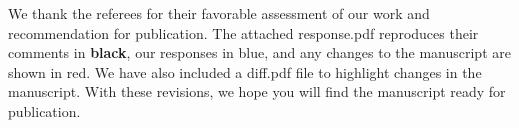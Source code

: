 \documentclass[12pt,stdletter,dateno,sigleft]{newlfm} %
\newcommand{\cor}{\color{red}}
\newcommand{\cob}{\color{blue}}
\begin{document}
\begin{newlfm}


We thank the referees for their favorable assessment of our work and recommendation for publication.  The attached response.pdf reproduces their comments in {\bf black}, our responses in {\cob blue}, and any changes to the manuscript are shown in {\cor red}.  We have also included a diff.pdf file to highlight changes in the manuscript.  With these revisions, we hope you will find the manuscript ready for publication.

\end{newlfm}

\end{document}
